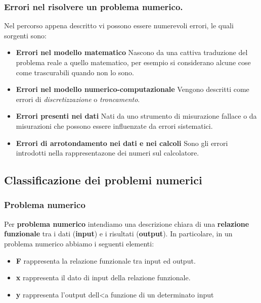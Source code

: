 \subsubsection{Errori nel risolvere un problema numerico.}
Nel percorso appena descritto vi possono essere numerevoli errori, 
%
le quali sorgenti sono:
\begin{itemize}
    \item \textbf{Errori nel modello matematico} Nascono da una cattiva 
%
    traduzione del problema reale a quello matematico, per esempio si 
%
    considerano alcune cose come trascurabili quando non lo sono.
    \item \textbf{Errori nel modello numerico-computazionale} Vengono 
%
    descritti come errori di \textit{discretizzazione} o \textit{troncamento}.
    \item \textbf{Errori presenti nei dati} Nati da uno strumento di
%
    misurazione fallace o da misurazioni che possono essere influenzate
%
    da errori sistematici.
    \item \textbf{Errori di arrotondamento nei dati e nei calcoli} Sono 
%
    gli errori introdotti nella rappresentazone dei numeri sul calcolatore.
\end{itemize}
\newpage
\subsection{Classificazione dei problemi numerici}
\subsubsection{Problema numerico}
{
    Per \textbf{problema numerico}
        intendiamo una descrizione chiara di una \textbf{relazione funzionale}  
        tra i dati (\textbf{input}) e i risultati (\textbf{output}).   
}
In particolare, in un problema numerico abbiamo i seguenti elementi:
\begin{itemize}
    \item \textbf{F} rappresenta la relazione funzionale tra input ed output.
    \item \textbf{x} rappresenta il dato di input della relazione funzionale.
    \item \textbf{y} rappresenta l’output dell<a funzione di un determinato input
\end{itemize}
